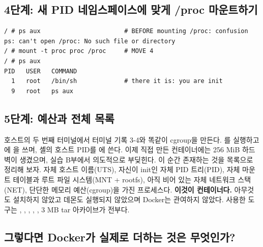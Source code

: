 \subsection*{4단계: 새 PID 네임스페이스에 맞게 /proc 마운트하기}

\begin{terminalbox}
\begin{Verbatim}[breaklines=true,breakanywhere=true,fontsize=\small,formatcom=\color{tbbtermfg},codes=\tbbcodeactive]
/ # ps aux                       # BEFORE mounting /proc: confusion
ps: can't open /proc: No such file or directory
/ # mount -t proc proc /proc     # MOVE 4
/ # ps aux
PID   USER   COMMAND
  1   root   /bin/sh             # there it is: you are init
  9   root   ps aux
\end{Verbatim}
\end{terminalbox}

\subsection*{5단계: 예산과 전체 목록}

호스트의 두 번째 터미널에서 터미널 기록 3-4와 똑같이 cgroup을 만든다. 를 실행하고 에 을 쓰며, 셸의 호스트 PID를 에 쓴다. 이제 직접 만든 컨테이너에는 256 MiB 하드 벽이 생겼으며, 실습 B부에서 의도적으로 부딪힌다. 이 순간 존재하는 것을 목록으로 정리해 보자. 자체 호스트 이름(UTS), 자신이 init인 자체 PID 트리(PID), 자체 마운트 테이블과 루트 파일 시스템(MNT + rootfs), 아직 비어 있는 자체 네트워크 스택(NET), 단단한 메모리 예산(cgroup)을 가진 프로세스다. \textbf{이것이 컨테이너다.} 아무것도 설치하지 않았고 데몬도 실행되지 않았으며 Docker는 관여하지 않았다. 사용한 도구는 , , , , , 3 MB tar 아카이브가 전부다.

\subsection*{그렇다면 Docker가 실제로 더하는 것은 무엇인가?}

